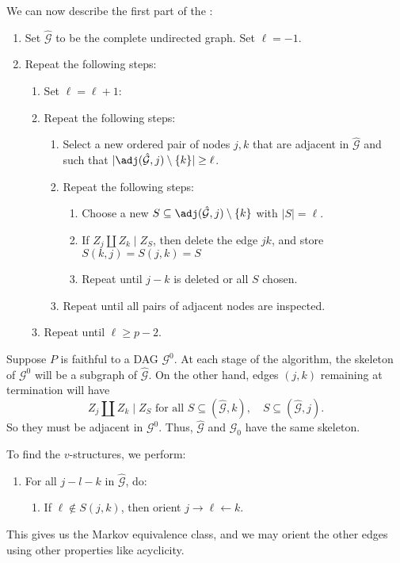 \documentclass[a4paper]{article}
\begin{document}
We can now describe the first part of the :
\begin{enumerate}
  \item Set $\hat{\mathcal{G}}$ to be the complete undirected graph. Set $\ell = -1$.
  \item Repeat the following steps:
    \begin{enumerate}
      \item Set $\ell = \ell + 1$:
      \item Repeat the following steps:
        \begin{enumerate}
          \item Select a new ordered pair of nodes $j, k$ that are adjacent in $\hat{\mathcal{G}}$ and such that $|\adj(\hat{\mathcal{G}}, j) \setminus \{k\}| \geq \ell$.
          \item Repeat the following steps:
            \begin{enumerate}
              \item Choose a new $S \subseteq \adj(\hat{\mathcal{G}}, j) \setminus \{k\}$ with $|S| = \ell$.
              \item If $Z_j \amalg Z_k \mid Z_S$, then delete the edge $jk$, and store $S(k, j) = S(j, k) = S$
              \item Repeat until $j-k$ is deleted or all $S$ chosen.
            \end{enumerate}
          \item Repeat until all pairs of adjacent nodes are inspected.
        \end{enumerate}
      \item Repeat until $\ell \geq p - 2$.
    \end{enumerate}
\end{enumerate}
Suppose $P$ is faithful to a DAG $\mathcal{G}^0$. At each stage of the algorithm, the skeleton of $\mathcal{G}^0$ will be a subgraph of $\hat{\mathcal{G}}$. On the other hand, edges $(j, k)$ remaining at termination will have
\[
  Z_j \amalg Z_k \mid Z_S\text{ for all }S \subseteq (\hat{\mathcal{G}}, k),\quad S \subseteq (\hat{\mathcal{G}}, j).
\]
So they must be adjacent in $\mathcal{G}^0$. Thus, $\hat{\mathcal{G}}$ and $\mathcal{G}_0$ have the same skeleton.

To find the $v$-structures, we perform:
\begin{enumerate}
  \item For all $j-l-k$ in $\hat{\mathcal{G}}$, do:
    \begin{enumerate}
      \item If $\ell \not \in S(j, k)$, then orient $j \to \ell \leftarrow k$.
    \end{enumerate}
\end{enumerate}
This gives us the Markov equivalence class, and we may orient the other edges using other properties like acyclicity.
\end{document}
